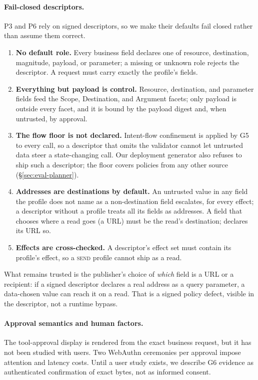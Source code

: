 \documentclass[letterpaper,twocolumn,10pt]{article}
\newcommand{\code}[1]{\texttt{\detokenize{#1}}}
\newcommand{\SEND}{\textsc{send}}
\begin{document}
\paragraph{Fail-closed descriptors.} P3 and P6 rely on signed descriptors,
so we make their defaults fail closed rather than assume them correct.
\begin{enumerate}
\item \textbf{No default role.} Every business field declares one of
  resource, destination, magnitude, payload, or parameter; a missing or
  unknown role rejects the descriptor. A request must carry exactly the
  profile's fields.
\item \textbf{Everything but payload is control.} Resource, destination,
  and parameter fields feed the \textsf{Scope}, \textsf{Destination}, and
  \textsf{Argument} facets; only payload is outside every facet, and it is
  bound by the payload digest and, when untrusted, by approval.
\item \textbf{The flow floor is not declared.} Intent-flow confinement is
  applied by G5 to every call, so a descriptor that omits the validator
  cannot let untrusted data steer a state-changing call. Our deployment
  generator also refuses to ship such a descriptor; the floor covers
  policies from any other source (\S\ref{sec:eval-planner}).
\item \textbf{Addresses are destinations by default.} An untrusted value
  in any field the profile does not name as a non-destination field
  escalates, for every effect; a descriptor without a profile treats all
  its fields as addresses. A field that chooses where a read goes (a URL)
  must be the read's destination; \code{dojo.web.get} declares its URL so.
\item \textbf{Effects are cross-checked.} A descriptor's effect set must
  contain its profile's effect, so a \SEND{} profile cannot ship as a read.
\end{enumerate}
What remains trusted is the publisher's choice of \emph{which} field is a
URL or a recipient: if a signed descriptor declares a real address as a
query parameter, a data-chosen value can reach it on a read. That is a
signed policy defect, visible in the descriptor, not a runtime bypass.

\paragraph{Approval semantics and human factors.} The tool-approval
display is rendered from the exact business request, but it has not been
studied with users. Two WebAuthn ceremonies per approval impose attention
and latency costs. Until a user study exists, we describe G6 evidence as
authenticated confirmation of exact bytes, not as informed consent.
\end{document}
